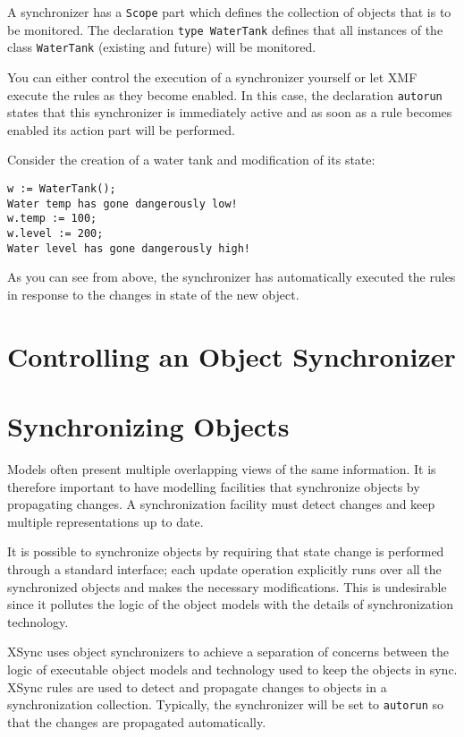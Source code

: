 \documentclass{article}
\begin{document}
A synchronizer has a {\tt Scope} part which defines the collection of objects that is to be
monitored. The declaration {\tt type WaterTank} defines that all instances of the class
{\tt WaterTank} (existing and future) will be monitored.

You can either control the execution of a synchronizer yourself or let XMF execute the
rules as they become enabled. In this case, the declaration {\tt autorun} states that
this synchronizer is immediately active and as soon as a rule becomes enabled its
action part will be performed.

Consider the creation of a water tank and modification of its state:
\begin{verbatim}
w := WaterTank();
Water temp has gone dangerously low!
w.temp := 100;
w.level := 200;
Water level has gone dangerously high!
\end{verbatim}
As you can see from above, the synchronizer has automatically executed the rules in
response to the changes in state of the new object. 

\section{Controlling an Object Synchronizer}

\section{Synchronizing Objects}

Models often present multiple overlapping views of the same information.
It is therefore important to have modelling facilities that synchronize
objects by propagating changes. A synchronization facility must detect
changes and keep multiple representations up to date. 

It is possible to synchronize objects by requiring that state change
is performed through a standard interface; each update operation 
explicitly runs over all the synchronized objects and makes the
necessary modifications. This is undesirable since it pollutes the
logic of the object models with the details of synchronization
technology.

XSync uses object synchronizers to achieve a separation of concerns
between the logic of executable object models and technology used
to keep the objects in sync. XSync rules are used to detect and
propagate changes to objects in a synchronization collection. Typically,
the synchronizer will be set to {\tt autorun} so that the changes are
propagated automatically.
\end{document}
